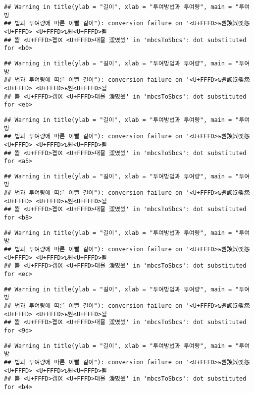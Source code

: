\documentclass[]{article}
\begin{document}
\begin{verbatim}
## Warning in title(ylab = "길이", xlab = "투여방법과 투여량", main = "투여방
## 법과 투여량에 따른 이빨 길이"): conversion failure on '<U+FFFD>ъ뿬諛⑸쾿怨<U+FFFD> <U+FFFD>ъ뿬<U+FFFD>됱
## 뿉 <U+FFFD>곕Ⅸ <U+FFFD>대묠 湲몄씠' in 'mbcsToSbcs': dot substituted for <b0>
\end{verbatim}

\begin{verbatim}
## Warning in title(ylab = "길이", xlab = "투여방법과 투여량", main = "투여방
## 법과 투여량에 따른 이빨 길이"): conversion failure on '<U+FFFD>ъ뿬諛⑸쾿怨<U+FFFD> <U+FFFD>ъ뿬<U+FFFD>됱
## 뿉 <U+FFFD>곕Ⅸ <U+FFFD>대묠 湲몄씠' in 'mbcsToSbcs': dot substituted for <eb>
\end{verbatim}

\begin{verbatim}
## Warning in title(ylab = "길이", xlab = "투여방법과 투여량", main = "투여방
## 법과 투여량에 따른 이빨 길이"): conversion failure on '<U+FFFD>ъ뿬諛⑸쾿怨<U+FFFD> <U+FFFD>ъ뿬<U+FFFD>됱
## 뿉 <U+FFFD>곕Ⅸ <U+FFFD>대묠 湲몄씠' in 'mbcsToSbcs': dot substituted for <a5>
\end{verbatim}

\begin{verbatim}
## Warning in title(ylab = "길이", xlab = "투여방법과 투여량", main = "투여방
## 법과 투여량에 따른 이빨 길이"): conversion failure on '<U+FFFD>ъ뿬諛⑸쾿怨<U+FFFD> <U+FFFD>ъ뿬<U+FFFD>됱
## 뿉 <U+FFFD>곕Ⅸ <U+FFFD>대묠 湲몄씠' in 'mbcsToSbcs': dot substituted for <b8>
\end{verbatim}

\begin{verbatim}
## Warning in title(ylab = "길이", xlab = "투여방법과 투여량", main = "투여방
## 법과 투여량에 따른 이빨 길이"): conversion failure on '<U+FFFD>ъ뿬諛⑸쾿怨<U+FFFD> <U+FFFD>ъ뿬<U+FFFD>됱
## 뿉 <U+FFFD>곕Ⅸ <U+FFFD>대묠 湲몄씠' in 'mbcsToSbcs': dot substituted for <ec>
\end{verbatim}

\begin{verbatim}
## Warning in title(ylab = "길이", xlab = "투여방법과 투여량", main = "투여방
## 법과 투여량에 따른 이빨 길이"): conversion failure on '<U+FFFD>ъ뿬諛⑸쾿怨<U+FFFD> <U+FFFD>ъ뿬<U+FFFD>됱
## 뿉 <U+FFFD>곕Ⅸ <U+FFFD>대묠 湲몄씠' in 'mbcsToSbcs': dot substituted for <9d>
\end{verbatim}

\begin{verbatim}
## Warning in title(ylab = "길이", xlab = "투여방법과 투여량", main = "투여방
## 법과 투여량에 따른 이빨 길이"): conversion failure on '<U+FFFD>ъ뿬諛⑸쾿怨<U+FFFD> <U+FFFD>ъ뿬<U+FFFD>됱
## 뿉 <U+FFFD>곕Ⅸ <U+FFFD>대묠 湲몄씠' in 'mbcsToSbcs': dot substituted for <b4>
\end{verbatim}
\end{document}
